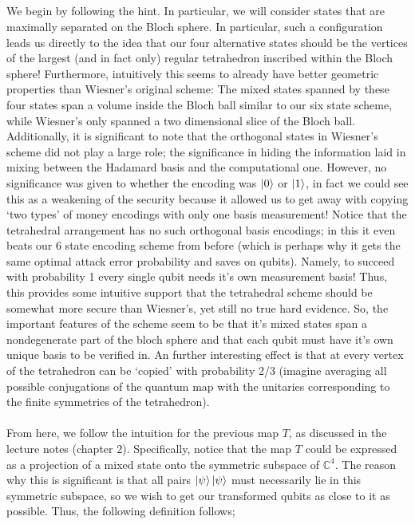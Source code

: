 \documentclass[12pt]{article}
\begin{document}
\begin{enumerate}
\subsection{}
We begin by following the hint. In particular, we will consider states that are maximally separated on the Bloch sphere. In particular, such a configuration leads us directly to the idea that our four alternative states should be the vertices of the largest (and in fact only) regular tetrahedron inscribed within the Bloch sphere! Furthermore, intuitively this seems to already have better geometric properties than Wiesner's original scheme: The mixed states spanned by these four states span a volume inside the Bloch ball similar to our six state scheme, while Wiesner's only spanned a two dimensional slice of the Bloch ball. Additionally, it is significant to note that the orthogonal states in Wiesner's scheme did not play a large role; the significance in hiding the information laid in mixing between the Hadamard basis and the computational one. However, no significance was given to whether the encoding was $\ket{0}$ or $\ket{1}$, in fact we could see this as a weakening of the security because it allowed us to get away with copying `two types' of money encodings with only one basis measurement! Notice that the tetrahedral arrangement has no such orthogonal basis encodings; in this it even beats our 6 state encoding scheme from before (which is perhaps why it gets the same optimal attack error probability and saves on qubits). Namely, to succeed with probability 1 every single qubit needs it's own measurement basis! Thus, this provides some intuitive support that the tetrahedral scheme should be somewhat more secure than Wiesner's, yet still no true hard evidence. So, the important features of the scheme seem to be that it's mixed states span a nondegenerate part of the bloch sphere and that each qubit must have it's own unique basis to be verified in. An further interesting effect is that at every vertex of the tetrahedron can be `copied' with probability 2/3 (imagine averaging all possible conjugations of the quantum map with the unitaries corresponding to the finite symmetries of the tetrahedron). \\ \\
From here, we follow the intuition for the previous map $T$, as discussed in the lecture notes (chapter 2). Specifically, notice that the map $T$ could be expressed as a projection of a mixed state onto the symmetric subspace of $\mathbb{C}^4$. The reason why this is significant is that all pairs $\ket{\psi}\ket{\psi}$ must necessarily lie in this symmetric subspace, so we wish to get our transformed qubits as close to it as possible. Thus, the following definition follows;

\end{enumerate}
\end{document}
